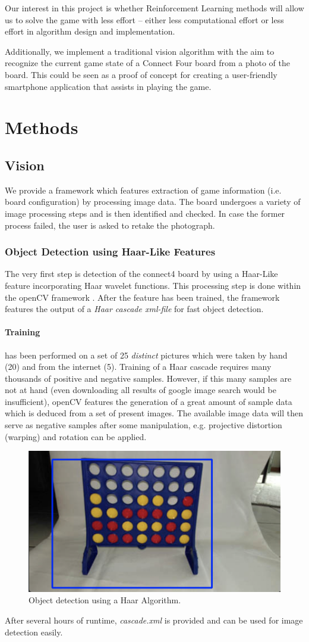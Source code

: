 \documentclass[10pt,twocolumn,letterpaper]{article}
\begin{document}
Our interest in this project is whether Reinforcement Learning methods will allow us to solve the game with less effort -- either less computational effort or less effort in algorithm design and implementation.

Additionally, we implement a traditional vision algorithm with the aim to
recognize the current game state of a Connect Four board from a photo of the
board. This could be seen as a proof of concept for creating a user-friendly smartphone application that assists in playing the game.

\section{Methods}

\subsection{Vision}
We provide a framework which features extraction of game information (i.e. board configuration) by processing image data.
The board undergoes a variety of image processing steps and is then identified and checked.
In case the former process failed, the user is asked to retake the photograph.

\subsubsection{Object Detection using Haar-Like Features}
The very first step is detection of the connect4 board by using a Haar-Like feature incorporating Haar wavelet functions.
This processing step is done within the openCV framework \parencite{openCV}.
After the feature has been trained, the framework features the output of a \textit{Haar cascade xml-file} for fast object detection.

\paragraph{Training} has been performed on a set of 25 \textit{distinct} pictures which were taken by hand (20) and from the internet (5).
Training of a Haar cascade requires many thousands of positive and negative samples\cite{kuranov}. However, if this many samples are not at hand (even downloading all results of google image search would be insufficient), openCV features the generation of a great amount of sample data which is deduced from a set of present images.
The available image data will then serve as negative samples after some manipulation, e.g. projective distortion (warping) and rotation can be applied.
\begin{figure}[bh]
  \centering
  \includegraphics[width = .3\textwidth]{figures/detection.png}
  \caption{Object detection using a Haar Algorithm.}
  \label{fig:haarDetection}
\end{figure}
After several hours of runtime, \textit{cascade.xml} is provided and can be used for image detection easily.
\end{document}

